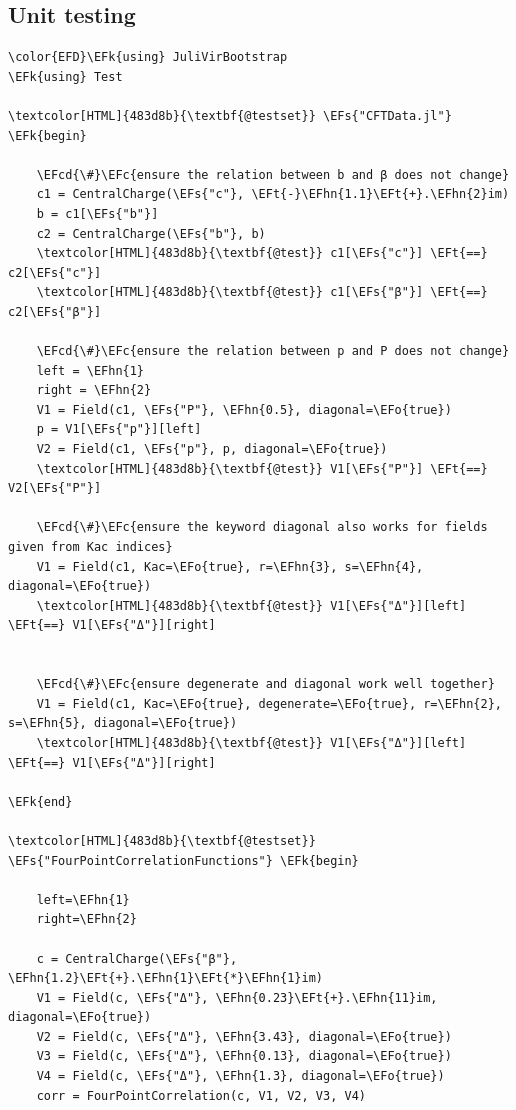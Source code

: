 \documentclass[a4paper]{article}
\numberwithin{equation}{section}
\newcommand{\EFc}[1]{\textcolor{EFc}{#1}} %
\newcommand{\EFcd}[1]{\textcolor{EFcd}{#1}} %
\newcommand{\EFs}[1]{\textcolor{EFs}{#1}} %
\newcommand{\EFk}[1]{\textcolor{EFk}{#1}} %
\newcommand{\EFt}[1]{\textcolor{EFt}{#1}} %
\newcommand{\EFo}[1]{\textcolor{EFo}{#1}} %
\newcommand{\EFhn}[1]{\textcolor{EFhn}{#1}} %
\begin{document}
\subsection{Unit testing}
\label{sec:org36f4d48}
\begin{Code}
\begin{Verbatim}
\color{EFD}\EFk{using} JuliVirBootstrap
\EFk{using} Test

\textcolor[HTML]{483d8b}{\textbf{@testset}} \EFs{"CFTData.jl"} \EFk{begin}

    \EFcd{\#}\EFc{ensure the relation between b and β does not change}
    c1 = CentralCharge(\EFs{"c"}, \EFt{-}\EFhn{1.1}\EFt{+}.\EFhn{2}im)
    b = c1[\EFs{"b"}]
    c2 = CentralCharge(\EFs{"b"}, b)
    \textcolor[HTML]{483d8b}{\textbf{@test}} c1[\EFs{"c"}] \EFt{==} c2[\EFs{"c"}]
    \textcolor[HTML]{483d8b}{\textbf{@test}} c1[\EFs{"β"}] \EFt{==} c2[\EFs{"β"}]

    \EFcd{\#}\EFc{ensure the relation between p and P does not change}
    left = \EFhn{1}
    right = \EFhn{2}
    V1 = Field(c1, \EFs{"P"}, \EFhn{0.5}, diagonal=\EFo{true})
    p = V1[\EFs{"p"}][left]
    V2 = Field(c1, \EFs{"p"}, p, diagonal=\EFo{true})
    \textcolor[HTML]{483d8b}{\textbf{@test}} V1[\EFs{"P"}] \EFt{==} V2[\EFs{"P"}]

    \EFcd{\#}\EFc{ensure the keyword diagonal also works for fields given from Kac indices}
    V1 = Field(c1, Kac=\EFo{true}, r=\EFhn{3}, s=\EFhn{4}, diagonal=\EFo{true})
    \textcolor[HTML]{483d8b}{\textbf{@test}} V1[\EFs{"Δ"}][left] \EFt{==} V1[\EFs{"Δ"}][right]


    \EFcd{\#}\EFc{ensure degenerate and diagonal work well together}
    V1 = Field(c1, Kac=\EFo{true}, degenerate=\EFo{true}, r=\EFhn{2}, s=\EFhn{5}, diagonal=\EFo{true})
    \textcolor[HTML]{483d8b}{\textbf{@test}} V1[\EFs{"Δ"}][left] \EFt{==} V1[\EFs{"Δ"}][right]

\EFk{end}

\textcolor[HTML]{483d8b}{\textbf{@testset}} \EFs{"FourPointCorrelationFunctions"} \EFk{begin}

    left=\EFhn{1}
    right=\EFhn{2}

    c = CentralCharge(\EFs{"β"}, \EFhn{1.2}\EFt{+}.\EFhn{1}\EFt{*}\EFhn{1}im)
    V1 = Field(c, \EFs{"Δ"}, \EFhn{0.23}\EFt{+}.\EFhn{11}im, diagonal=\EFo{true})
    V2 = Field(c, \EFs{"Δ"}, \EFhn{3.43}, diagonal=\EFo{true})
    V3 = Field(c, \EFs{"Δ"}, \EFhn{0.13}, diagonal=\EFo{true})
    V4 = Field(c, \EFs{"Δ"}, \EFhn{1.3}, diagonal=\EFo{true})
    corr = FourPointCorrelation(c, V1, V2, V3, V4)


\end{Verbatim}
\end{Code}
\end{document}
